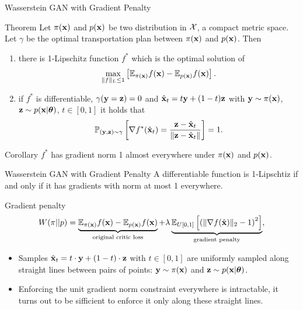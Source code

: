 \documentclass{beamer}
\begin{document}
\begin{frame}{Wasserstein GAN with Gradient Penalty}
	\begin{block}{Theorem}
		Let $\pi(\mathbf{x})$ and $p(\mathbf{x})$ be two distribution in $\mathcal{X}$, a compact metric space. Let $\gamma$ be the optimal transportation plan between $\pi(\mathbf{x})$ and $p(\mathbf{x})$. Then
		\begin{enumerate}
			\item there is 1-Lipschitz function $f^*$ which is the optimal solution of 
			\[
				\max_{\| f \|_L \leq 1} \left[ \mathbb{E}_{\pi(\mathbf{x})} f(\mathbf{x})  - \mathbb{E}_{p(\mathbf{x})} f(\mathbf{x})\right].
			\]
			\item if $f^*$ is differentiable, $\gamma(\mathbf{y} = \mathbf{z}) = 0$ and $\hat{\mathbf{x}}_t = t \mathbf{y} + (1 - t) \mathbf{z}$ with $\mathbf{y} \sim \pi(\mathbf{x})$, $\mathbf{z} \sim p(\mathbf{x} | \boldsymbol{\theta})$, $t \in [0, 1]$ it holds that
			\[
				\mathbb{P}_{(\mathbf{y}, \mathbf{z}) \sim \gamma} \left[ \nabla f^*(\hat{\mathbf{x}}_t) = \frac{\mathbf{z} - \hat{\mathbf{x}}_t}{\| \mathbf{z} - \hat{\mathbf{x}}_t \|} \right] = 1.
			\]
		\end{enumerate}
	\end{block}
	\vspace{-0.5cm}
	\begin{block}{Corollary}
		$f^*$ has gradient norm 1 almost everywhere under $\pi(\mathbf{x})$ and $p(\mathbf{x})$.
	\end{block}

\end{frame}
\begin{frame}{Wasserstein GAN with Gradient Penalty}
	A differentiable function is 1-Lipschtiz if and only if it has gradients with norm at most 1 everywhere.
	\begin{block}{Gradient penalty}
		\vspace{-0.3cm}
		\[
			W(\pi || p) = \underbrace{\mathbb{E}_{\pi(\mathbf{x})} f(\mathbf{x})  - \mathbb{E}_{p(\mathbf{x})} f(\mathbf{x})}_{\text{original critic loss}} + \lambda \underbrace{\mathbb{E}_{U[0, 1]} \left[ \left( \| \nabla f(\hat{\mathbf{x}}) \|_2 - 1 \right) ^ 2\right]}_{\text{gradient penalty}},
		\]
		\vspace{-0.3cm}
	\end{block}
	\begin{itemize}
		\item Samples $\hat{\mathbf{x}}_t = t \cdot \mathbf{y} + (1 - t) \cdot \mathbf{z}$ with $t \in [0, 1]$ are uniformly sampled along straight lines between pairs of points: $\mathbf{y} \sim \pi(\mathbf{x})$ and $\mathbf{z} \sim p(\mathbf{x} | \boldsymbol{\theta})$.
		\item Enforcing the unit gradient norm constraint everywhere is intractable, it turns out to be sifficient to enforce it only along these straight lines.
	\end{itemize}

\end{frame}
\end{document}

